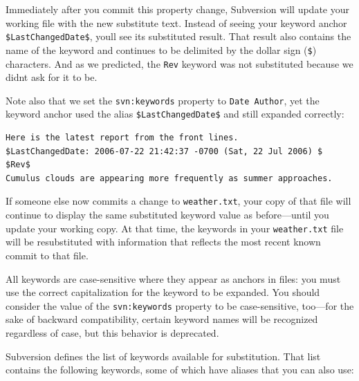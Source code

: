 Immediately after you commit this property change, Subversion will
update your working file with the new substitute text. Instead of seeing
your keyword anchor \texttt{\$LastChangedDate\$}, you\textquotesingle ll
see its substituted result. That result also contains the name of the
keyword and continues to be delimited by the dollar sign (\texttt{\$})
characters. And as we predicted, the \texttt{Rev} keyword was not
substituted because we didn\textquotesingle t ask for it to be.

Note also that we set the \texttt{svn:keywords} property to
\texttt{Date\ Author}, yet the keyword anchor used the alias
\texttt{\$LastChangedDate\$} and still expanded correctly:

\begin{verbatim}
Here is the latest report from the front lines.
$LastChangedDate: 2006-07-22 21:42:37 -0700 (Sat, 22 Jul 2006) $
$Rev$
Cumulus clouds are appearing more frequently as summer approaches.
\end{verbatim}

If someone else now commits a change to \texttt{weather.txt}, your copy
of that file will continue to display the same substituted keyword value
as before---until you update your working copy. At that time, the
keywords in your \texttt{weather.txt} file will be resubstituted with
information that reflects the most recent known commit to that file.

All keywords are case-sensitive where they appear as anchors in files:
you must use the correct capitalization for the keyword to be expanded.
You should consider the value of the \texttt{svn:keywords} property to
be case-sensitive, too---for the sake of backward compatibility, certain
keyword names will be recognized regardless of case, but this behavior
is deprecated.

Subversion defines the list of keywords available for substitution. That
list contains the following keywords, some of which have aliases that
you can also use:

